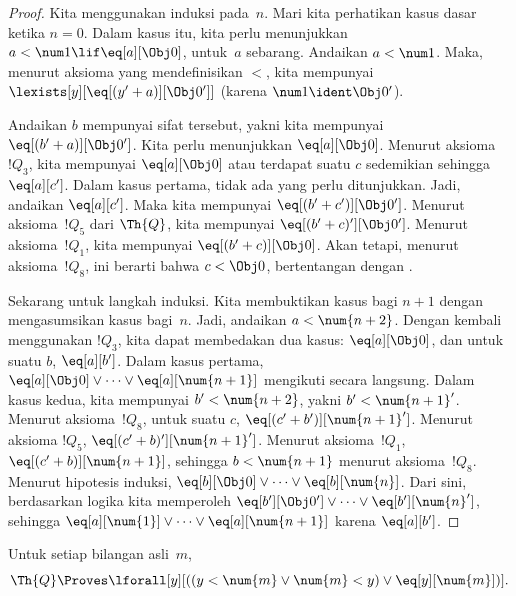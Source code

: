 \documentclass[../../../include/open-logic-section]{subfiles}
\begin{document}
\begin{proof}
Kita menggunakan induksi pada~$n$. Mari kita perhatikan kasus dasar ketika
$n = 0$. Dalam kasus itu, kita perlu menunjukkan
$a < \num 1 \lif \eq[a][\Obj 0]$, untuk~$a$ sebarang. Andaikan
$a < \num 1$. Maka, menurut aksioma yang mendefinisikan $<$, kita mempunyai
$\lexists[y][\eq[(y'+a)][\Obj 0']]$ (karena
$\num 1 \ident \Obj 0'$).

Andaikan $b$ mempunyai sifat tersebut, yakni kita mempunyai
$\eq[(b'+a)][\Obj 0']$. Kita perlu menunjukkan $\eq[a][\Obj 0]$. Menurut
aksioma~$!Q_3$, kita mempunyai $\eq[a][\Obj 0]$ atau terdapat suatu $c$
sedemikian sehingga $\eq[a][c']$. Dalam kasus pertama, tidak ada yang perlu
ditunjukkan. Jadi, andaikan $\eq[a][c']$. Maka kita mempunyai
$\eq[(b' + c')][\Obj 0']$. Menurut aksioma~$!Q_5$ dari $\Th{Q}$, kita
mempunyai $\eq[(b'+c)'][\Obj 0']$. Menurut aksioma~$!Q_1$, kita mempunyai
$\eq[(b' + c)][\Obj 0]$. Akan tetapi, menurut aksioma~$!Q_8$, ini berarti
bahwa $c < \Obj 0$, bertentangan dengan .

Sekarang untuk langkah induksi. Kita membuktikan kasus bagi $n+1$ dengan
mengasumsikan kasus bagi~$n$. Jadi, andaikan $a < \num {n+2}$. Dengan
kembali menggunakan $!Q_3$, kita dapat membedakan dua kasus:
$\eq[a][\Obj 0]$, dan untuk suatu $b$, $\eq[a][b']$. Dalam kasus pertama,
$\eq[a][\Obj 0] \lor \dots \lor \eq[a][\num{n+1}]$ mengikuti secara
langsung. Dalam kasus kedua, kita mempunyai $b' < \num {n+2}$, yakni
$b' < \num{n+1}'$. Menurut aksioma~$!Q_8$, untuk suatu $c$,
$\eq[(c'+b')][\num{n+1}']$. Menurut aksioma $!Q_5$,
$\eq[(c'+b)'][\num{n+1}']$. Menurut aksioma~$!Q_1$,
$\eq[(c'+b)][\num{n+1}]$, sehingga $b < \num{n+1}$ menurut
aksioma~$!Q_8$. Menurut hipotesis induksi,
$\eq[b][\Obj 0] \lor \dots \lor \eq[b][\num{n}]$. Dari sini, berdasarkan
logika kita memperoleh
$\eq[b'][\Obj 0'] \lor \dots \lor \eq[b'][\num{n}']$, sehingga
$\eq[a][\num{1}] \lor \dots \lor \eq[a][\num{n+1}]$ karena
$\eq[a][b']$.
\end{proof}

\begin{lem}
   Untuk setiap bilangan asli~$m$,
  \[
  \Th{Q} \Proves
  \lforall[y][((y < \num{m} \lor \num{m} < y) \lor \eq[y][\num{m}])].
  \]
\end{lem}
\end{document}
